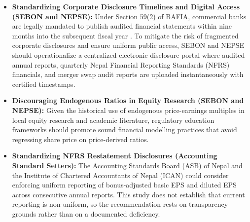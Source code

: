 \begin{itemize}
    \item \textbf{Standardizing Corporate Disclosure Timelines and Digital Access (SEBON and NEPSE):}
    Under Section 59(2) of BAFIA, commercial banks are legally mandated to publish audited financial statements within nine months into the subsequent fiscal year \citep{bafia2017}. To mitigate the risk of fragmented corporate disclosures and ensure uniform public access, SEBON and NEPSE should operationalize a centralized electronic disclosure portal where audited annual reports, quarterly Nepal Financial Reporting Standards (NFRS) financials, and merger swap audit reports are uploaded instantaneously with certified timestamps.
    \item \textbf{Discouraging Endogenous Ratios in Equity Research (SEBON and NEPSE):}
    Given the historical use of endogenous price-earnings multiples in local equity research and academic literature, regulatory education frameworks should promote sound financial modelling practices that avoid regressing share price on price-derived ratios.
    \item \textbf{Standardizing NFRS Restatement Disclosures (Accounting Standard Setters):}
    The Accounting Standards Board (ASB) of Nepal and the Institute of Chartered Accountants of Nepal (ICAN) could consider enforcing uniform reporting of bonus-adjusted basic EPS and diluted EPS across consecutive annual reports. This study does not establish that current reporting is non-uniform, so the recommendation rests on transparency grounds rather than on a documented deficiency.
\end{itemize}

